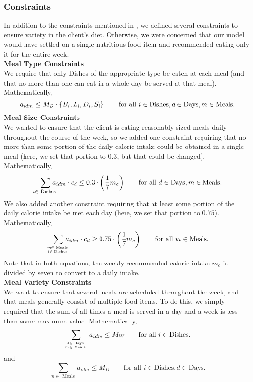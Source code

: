 \documentclass[twoside]{article}
\begin{document}
\subsubsection{Constraints}
In addition to the constraints mentioned in , we defined several constraints to ensure variety in the client's diet. Otherwise, we were concerned that our model would have settled on a single nutritious food item and recommended eating only it for the entire week.\\[.1in]
\textbf{Meal Type Constraints}\\[.1in]
We require that only Dishes of the appropriate type be eaten at each meal (and that no more than one can eat in a whole day be served at that meal). Mathematically,
\begin{equation*}
    a_{idm} \leq M_D \cdot \cbr{B_i, L_i, D_i, S_i} \qquad \text{for all } i \in \text{Dishes}, d \in \text{Days}, m \in \text{Meals}.
\end{equation*}
\textbf{Meal Size Constraints}\\[.1in]
We wanted to ensure that the client is eating reasonably sized meals daily throughout the course of the week, so we added one constraint requiring that no more than some portion of the daily calorie intake could be obtained in a single meal (here, we set that portion to $0.3$, but that could be changed). Mathematically,
\begin{equation*}
    \smashoperator[r]{\sum_{i \in \text{ Dishes }}}\thinspace a_{idm} \cdot c_d \leq 0.3 \cdot \del{\dfrac 17 m_c} \qquad \text{for all } d \in \text{Days}, m \in \text{Meals}.
\end{equation*}
We also added another constraint requiring that at least some portion of the daily calorie intake be met each day (here, we set that portion to $0.75$). Mathematically,
\begin{equation*}
    \smashoperator[r]{\sum_{m \in \text{ Meals } \atop i \in \text{ Dishes }}}\thinspace a_{idm} \cdot c_d \geq 0.75 \cdot \del{\dfrac 17 m_c} \qquad \text{for all } m \in \text{Meals}.
\end{equation*}
Note that in both equations, the weekly recommended calorie intake $m_c$ is divided by seven to convert to a daily intake.\\[.1in]
\textbf{Meal Variety Constraints}\\[.1in]
We want to ensure that several meals are scheduled throughout the week, and that meals generally consist of multiple food items. To do this, we simply required that the sum of all times a meal is served in a day and a week is less than some maximum value. Mathematically,
\begin{equation*}
    \sum_{d \in \text{ Days } \atop m \in \text{ Meals }} a_{idm} \leq M_W \qquad \text{for all } i \in \text{Dishes}.
\end{equation*}
and
\begin{equation*}
    \sum_{m \in \text{ Meals }} a_{idm} \leq M_D \qquad \text{for all } i \in \text{Dishes}, d \in \text{Days}.
\end{equation*}
\end{document}
